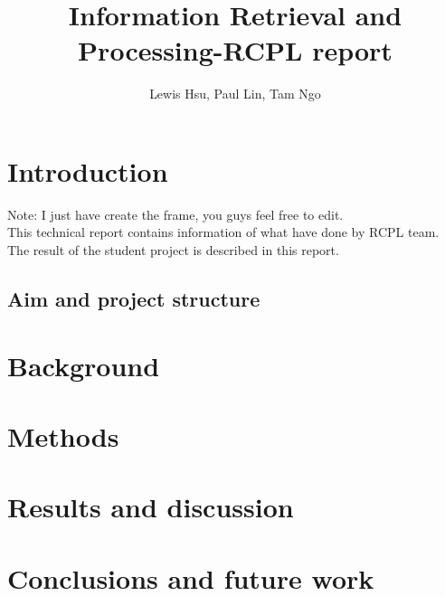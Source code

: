 \documentclass[a4paper,twocolumn,twoside]{article}
\begin{document}
 
	
	\title{Information Retrieval and Processing-RCPL report}
	\author{Lewis Hsu, Paul Lin, Tam Ngo}  %
	\maketitle   
	
	\section{Introduction}
	\label{Introduction}
	Note: I just have create the frame, you guys feel free to edit.\\
	This technical report contains information of what have done by RCPL team.
	The result of the student project is described in this report.
	
	\subsection{Aim and project structure}
	\label{aim}

	
	
		
	\section{Background}
	\label{Background}

	
	
	

	\section{Methods}
	\label{Methods}
	
	
	
	
	
	\section{Results and discussion}


	\section{Conclusions and future work}

		
	
		
	\clearpage 
\end{document}
